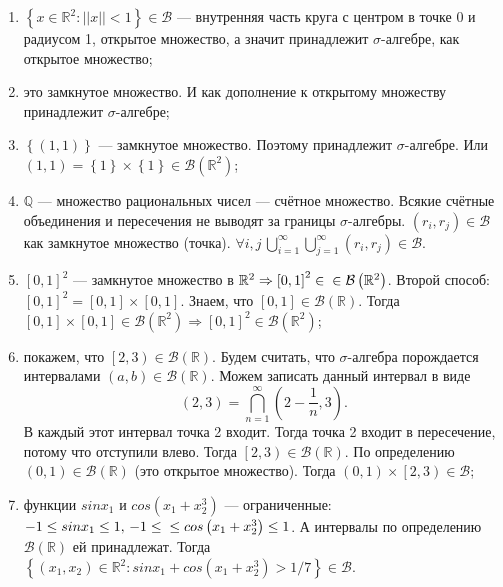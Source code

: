 \begin{enumerate}[label=\alph*)]
\item $ \left\{ x \in \mathbb{R}^2: \left| \left| x \right| \right| < 1 \right\} \in \mathcal{B} $ ---
внутренняя часть круга с центром в точке 0 и радиусом 1, открытое множество, а значит принадлежит $ \sigma $-алгебре, как открытое множество;
\item это замкнутое множество.
И как дополнение к открытому множеству принадлежит $ \sigma $-алгебре;
\item $ \left\{ \left( 1, 1 \right) \right\} $ --- замкнутое множество.
Поэтому принадлежит $ \sigma $-алгебре.
Или $ \left( 1, 1 \right) = \left\{ 1 \right\} \times \left\{ 1 \right\} \in \mathcal{B} \left( \mathbb{R}^2 \right) $;
\item $ \mathbb{Q} $ --- множество рациональных чисел --- счётное множество.
Всякие счётные объединения и пересечения не выводят за границы $ \sigma $-алгебры.
$ \left( r_i, r_j \right) \in \mathcal{B} $ как замкнутое множество (точка).
$ \forall i, j \, \bigcup \limits_{i=1}^{ \infty } \bigcup \limits_{j=1}^{ \infty } \left( r_i, r_j \right) \in \mathcal{B} $.
\item $ \left[ 0, 1 \right]^2$ --- замкнутое множество в $ \mathbb{R}^2 \Rightarrow \left[ 0, 1 \right]^2 \in \\
\in \mathcal{B} \left( \mathbb{R}^2 \right) $.
Второй способ: $ \left[ 0, 1 \right]^2 = \left[ 0, 1 \right] \times \left[ 0, 1 \right] $.
Знаем, что $ \left[ 0, 1 \right] \in \mathcal{B} \left( \mathbb{R} \right) $.
Тогда
$ \left[ 0, 1 \right] \times \left[ 0, 1 \right] \in \mathcal{B} \left( \mathbb{R}^2 \right) \Rightarrow
\left[ 0, 1 \right]^2 \in \mathcal{B} \left( \mathbb{R}^2 \right) $;
\item покажем, что $ \left[ 2, 3 \right) \in \mathcal{B} \left( \mathbb{R} \right) $.
Будем считать, что $ \sigma $-алгебра порождается интервалами $ \left( a, b \right) \in \mathcal{B} \left( \mathbb{R} \right) $.
Можем записать данный интервал в виде
$$ \left( 2, 3 \right) =
\bigcap \limits_{n=1}^{ \infty } \left( 2 - \frac{1}{n}, 3 \right).$$
В каждый этот интервал точка 2 входит.
Тогда точка 2 входит в пересечение, потому что отступили влево.
Тогда $ \left[ 2, 3 \right) \in \mathcal{B} \left( \mathbb{R} \right) $.
По определению $ \left( 0, 1 \right) \in \mathcal{B} \left( \mathbb{R} \right) $ (это открытое множество).
Тогда $ \left( 0, 1 \right) \times \left[ 2, 3 \right) \in \mathcal{B} $;
\item функции $sin x_1 $ и $cos \left( x_1 + x_2^3 \right) $ ---
ограниченные: $-1 \leq sin x_1 \leq 1, \, -1 \leq \\
\leq cos \left( x_1 + x_2^3 \right) \leq 1$.
А интервалы по определению $ \mathcal{B} \left( \mathbb{R} \right) $ ей принадлежат.
Тогда $ \left\{ \left( x_1, x_2 \right) \in \mathbb{R}^2: sin x_1 + cos \left( x_1 + x_2^3 \right) > 1/7 \right\} \in \mathcal{B} $.
\end{enumerate}

